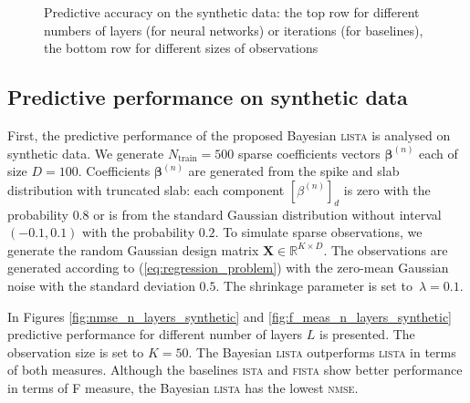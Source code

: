 \documentclass{article}
\begin{document}
\begin{figure}[t!]
{\label{fig:nmse_undersampling_synthetic}}
\caption{Predictive accuracy on the synthetic data: the top row for different numbers of layers (for neural networks) or iterations (for baselines),  the bottom row for different sizes of observations}
\label{fig:number_of_layers_synthetic}
\end{figure}

\subsection{Predictive performance on synthetic data}
First, the predictive performance of the proposed Bayesian \textsc{lista} is analysed on synthetic data. We generate $N_\text{train}=500$ sparse coefficients vectors $\boldsymbol\beta^{(n)}$ each of size $D = 100$. Coefficients $\boldsymbol\beta^{(n)}$ are generated from the spike and slab distribution with truncated slab: each component $[\beta^{(n)}]_{d}$ is zero with the probability $0.8$ or is from the standard Gaussian distribution without interval $(-0.1, 0.1)$ with the probability $0.2$. To simulate sparse observations, we generate the random Gaussian design matrix $\mathbf{X} \in \mathbb{R}^{K \times D}$.  The observations are generated according to (\ref{eq:regression_problem}) with the zero-mean Gaussian noise with the standard deviation $0.5$. The shrinkage parameter is set to~$\lambda = 0.1$.

In Figures \ref{fig:nmse_n_layers_synthetic} and \ref{fig:f_meas_n_layers_synthetic} predictive performance for different number of layers $L$ is presented. The observation size is set to $K=50$. The Bayesian \textsc{lista} outperforms \textsc{lista} in terms of both measures. Although the baselines \textsc{ista} and \textsc{fista} show better performance in terms of F measure, the Bayesian \textsc{lista} has the lowest \textsc{nmse}.
\end{document}
